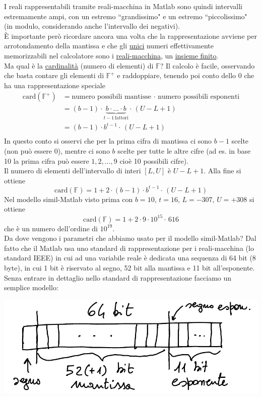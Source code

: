 I reali rappresentabili tramite reali-macchina in Matlab sono quindi intervalli estremamente ampi, con un estremo ``grandissimo" e un estremo ``piccolissimo" (in modulo, considerando anche l'intervallo dei negativi). \\
È importante però ricordare ancora una volta che la rappresentazione avviene per arrotondamento della mantissa e che gli \uline{unici} numeri effettivamente memorizzabili nel calcolatore sono i \uline{reali-macchina}, un \uline{insieme finito}.\\
Ma qual è la \uline{cardinalità} (numero di elementi) di $\mathbb{F}$? Il calcolo è facile, osservando che basta contare gli elementi di $\mathbb{F}^+$ e raddoppiare, tenendo poi conto dello 0 che ha una rappresentazione speciale
\[\begin{split}
    \text{card}(\mathbb{F}^+) & = \text{numero possibili mantisse} \,\cdot\, \text{numero possibili esponenti} \\
    & = (b-1)\cdot \underbrace{b \cdot \dotsc \cdot b}_{t - 1 \,\text{fattori}} \cdot \, (U - L + 1) \\
    & = (b-1)\cdot b^{t - 1} \cdot \, (U - L + 1) \\
\end{split}\]
In questo conto si osservi che per la prima cifra di mantissa ci sono $b - 1$ scelte (non può essere 0), mentre ci sono $b$ scelte per tutte le altre cifre (ad es. in base 10 la prima cifra può essere $1, 2, \dotsc , 9$ cioè 10 possibili cifre). \\
Il numero di elementi dell'intervallo di interi $[L,U]$ è $U-L+1$. Alla fine si ottiene
\[ \text{card}(\mathbb{F}) = 1 + 2 \cdot (b-1)\cdot b^{t - 1} \cdot \, (U - L + 1) \]
Nel modello simil-Matlab visto prima con $b = 10$, $t = 16$, $L = -307$, $U = +308$ si ottiene \[ \text{card}(\mathbb{F}) = 1 + 2 \cdot 9\cdot 10^{15} \cdot \, 616 \]
che è un numero dell'ordine di $10^{19}$.\\
Da dove vengono i parametri che abbiamo usato per il modello simil-Matlab? Dal fatto che il Matlab usa uno standard di rappresentazione per i reali-macchina (lo standard IEEE) in cui ad una variabile reale è dedicata una sequenza di 64 bit (8 byte), in cui 1 bit è riservato al segno, 52 bit alla mantissa e 11 bit all'esponente. \\
Senza entrare in dettaglio nello standard di rappresentazione facciamo un semplice modello:
\begin{center}
    \includegraphics[scale=0.65]{foto/img4}
\end{center}
